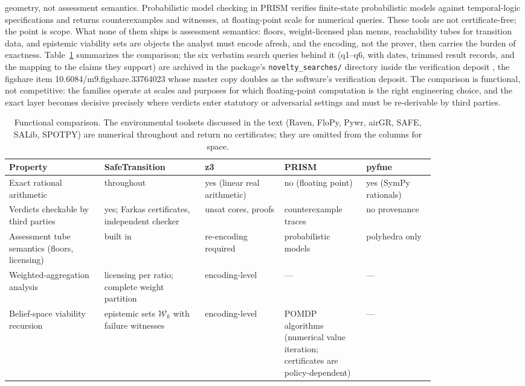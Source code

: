 \documentclass[3p,11pt]{elsarticle}
\begin{document}
geometry, not assessment semantics. Probabilistic
model checking in PRISM \citep{Kwiatkowska2011} verifies finite-state
probabilistic models against temporal-logic specifications and returns
counterexamples and witnesses, at floating-point scale for numerical
queries. These tools are not certificate-free; the point is scope. What
none of them ships is
assessment semantics: floors, weight-licensed plan menus, reachability tubes
for transition data, and epistemic viability sets are objects the analyst
must encode afresh, and the encoding, not the prover, then carries the
burden of exactness. Table~\ref{tab:compare} summarizes the comparison; the
six verbatim search queries behind it (q1--q6, with dates, trimmed
result records, and the mapping to the claims they support) are archived
in the package's \texttt{novelty\_searches/} directory inside the
verification deposit \citep{Deposit2026}, the figshare item
10.6084/m9.figshare.33764023 whose master copy doubles as the software's
verification deposit. The comparison is functional, not
competitive: the families operate at scales and purposes for which
floating-point computation is the right engineering choice, and the exact
layer becomes decisive precisely where verdicts enter statutory or
adversarial settings and must be re-derivable by third parties.

\begin{table}[t]
\centering
\small
\setlength{\tabcolsep}{3pt}
\begin{tabular}{@{}p{0.185\linewidth}p{0.19\linewidth}p{0.155\linewidth}p{0.15\linewidth}p{0.135\linewidth}@{}}
\toprule
Property & SafeTransition & z3 & PRISM & pyfme \\
\midrule
Exact rational arithmetic & throughout & yes (linear real arithmetic) & no (floating point) & yes (SymPy rationals) \\
Verdicts checkable by third parties & yes; Farkas certificates, independent checker & unsat cores, proofs & counterexample traces & no provenance \\
Assessment tube semantics (floors, licensing) & built in & re-encoding required & probabilistic models & polyhedra only \\
Weighted-aggregation analysis & licensing per ratio; complete weight partition & encoding-level & --- & --- \\
Belief-space viability recursion & epistemic sets $\mathcal{W}_k$ with failure witnesses & encoding-level & POMDP algorithms (numerical value iteration; certificates are policy-dependent) & --- \\
\bottomrule
\end{tabular}
\caption{Functional comparison. The environmental toolsets discussed in the
text (Raven, FloPy, Pywr, airGR, SAFE, SALib, SPOTPY) are numerical
throughout and return no certificates; they are omitted from the columns
for space.}
\label{tab:compare}
\end{table}
\end{document}
